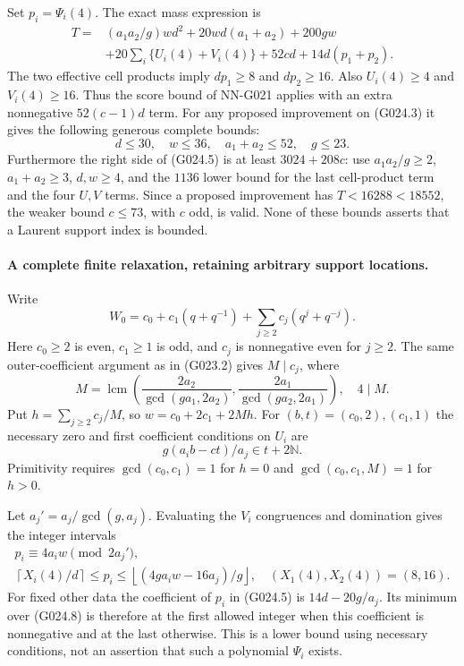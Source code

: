 Set $p_i=\Psi_i(4)$. The exact mass expression is
\[
 \begin{split}
 T={}&(a_1a_2/g)wd^2+20wd(a_1+a_2)+200gw\\
 &+20\sum_i\{U_i(4)+V_i(4)\}+52cd+14d(p_1+p_2).
 \end{split}                                                       \tag{G024.5}
\]
The two effective cell products imply $dp_1\ge8$ and
$dp_2\ge16$. Also $U_i(4)\ge4$ and $V_i(4)\ge16$.
Thus the score bound of NN-G021 applies with an extra
nonnegative $52(c-1)d$ term. For any proposed improvement
on (G024.3) it gives the following generous complete bounds:
\[
 d\le30,\quad w\le36,\quad a_1+a_2\le52,\quad g\le23.
 \tag{G024.6}
\]
Furthermore the right side of (G024.5) is at least
$3024+208c$: use $a_1a_2/g\ge2$, $a_1+a_2\ge3$,
$d,w\ge4$, and the $1136$ lower bound for the last
cell-product term and the four $U,V$ terms. Since a
proposed improvement has $T<16288<18552$, the weaker
bound $c\le73$, with $c$ odd, is valid. None of these
bounds asserts that a Laurent support index is bounded.

\paragraph{A complete finite relaxation, retaining arbitrary support locations.}
Write
\[
 W_0=c_0+c_1(q+q^{-1})+\sum_{j\ge2}c_j(q^j+q^{-j}).
\]
Here $c_0\ge2$ is even, $c_1\ge1$ is odd, and $c_j$
is nonnegative even for $j\ge2$. The same outer-coefficient
argument as in (G023.2) gives $M\mid c_j$, where
\[
 M=\operatorname{lcm}\left(
 \frac{2a_2}{\gcd(ga_1,2a_2)},
 \frac{2a_1}{\gcd(ga_2,2a_1)}\right),\quad 4\mid M.
\]
Put $h=\sum_{j\ge2}c_j/M$, so $w=c_0+2c_1+2Mh$.
For $(b,t)=(c_0,2),(c_1,1)$ the necessary zero and
first coefficient conditions on $U_i$ are
\[
 g(a_i b-ct)/a_j\in t+2\mathbb N.                     \tag{G024.7}
\]
Primitivity requires $\gcd(c_0,c_1)=1$ for $h=0$ and
$\gcd(c_0,c_1,M)=1$ for $h>0$.

Let $a_j'=a_j/\gcd(g,a_j)$. Evaluating the $V_i$
congruences and domination gives the integer intervals
\[
 \begin{gathered}
 p_i\equiv4a_iw\pmod{2a_j'},\\
 \left\lceil X_i(4)/d\right\rceil\le p_i\le
 \left\lfloor(4ga_iw-16a_j)/g\right\rfloor,
 \quad(X_1(4),X_2(4))=(8,16).
 \end{gathered}                                                       \tag{G024.8}
\]
For fixed other data the coefficient of $p_i$ in (G024.5)
is $14d-20g/a_j$. Its minimum over (G024.8) is therefore
at the first allowed integer when this coefficient is
nonnegative and at the last otherwise. This is a lower
bound using necessary conditions, not an assertion that
such a polynomial $\Psi_i$ exists.

